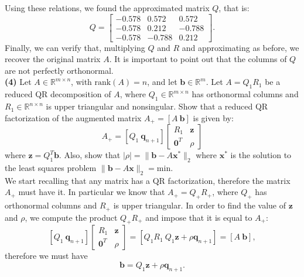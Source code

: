 \documentclass[a4paper,11pt]{article}
\newcommand{\R}{\mathbb{R}}
\begin{document}
Using these relations, we found the approximated matrix $Q$, that is:
\begin{equation}\label{key}
	Q = \begin{bmatrix}
		-0.578& 0.572 & 0.572 \\
		-0.578& 0.212 & -0.788 \\
		-0.578& -0.788 & 0.212
	\end{bmatrix}.
\end{equation}
Finally, we can verify that, multiplying $Q$ and $R$ and approximating as before, we recover the original matrix $A$. It is important to point out that the columns of $Q$ are not perfectly orthonormal.\\

\noindent \textbf{(4)} Let $A \in \R^{m\times n}$, with $\text{rank}(A) = n$, and let $\textbf{b} \in \R^m$. Let $A = Q_1R_1$ be a reduced QR decomposition of $A$, where $Q_1 \in \R^{m\times n}$ has orthonormal columns and $R_1 \in \R^{n\times n}$ is upper triangular and nonsingular. Show that a reduced QR factorization of the augmented matrix $A_+ = [ A\ \textbf{b} ]$ is given by:
\begin{equation}\label{key}
	A_+=[Q_1\  \textbf{q}_{n+1}] \begin{bmatrix}
		R_1& \textbf{z}  \\
		\textbf{0}^T& \rho 
	\end{bmatrix}
\end{equation}
where $\textbf{z} = Q_1^T\textbf{b}$. Also, show that $|\rho| = \lVert \textbf{b} - A \textbf{x}^*\rVert_2$ where $\textbf{x}^*$ is the solution to the least squares problem $\lVert \textbf{b} - A \textbf{x}\rVert_2= \text{min} $.\\
We start recalling that any matrix has a QR factorization, therefore the matrix $A_+$ must have it. In particular we know that $A_+ = Q_+ R_+$, where $Q_+$ has orthonormal columns and $R_+$ is upper triangular. In order to find the value of $\textbf{z}$ and $\rho$, we compute the product $Q_+ R_+$ and impose that it is equal to $A_+$:
\begin{equation}\label{key}
	[Q_1\  \textbf{q}_{n+1}] \begin{bmatrix}
		R_1& \textbf{z}  \\
		\textbf{0}^T& \rho 
	\end{bmatrix} = [Q_1 R_1\ Q_1\textbf{z} + \rho \textbf{q}_{n+1}] = [A\ \textbf{b}],
\end{equation}
therefore we must have 
\begin{equation}\label{key}
	\textbf{b} = Q_1 \textbf{z} + \rho \textbf{q}_{n+1}.
\end{equation}
\end{document}
